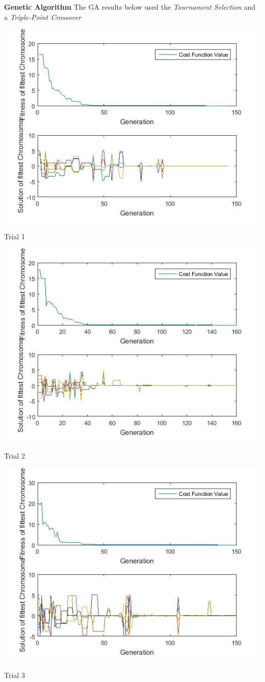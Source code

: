 \documentclass{article}
\begin{document}
\textbf{Genetic Algorithm} The GA results below used the \textit{Tournament Selection} and a \textit{Triple-Point Crossover}\\
\centerline{\includegraphics[width=0.5\linewidth]{ga_tf4_s1_c2a}}
\centerline{Trial 1}
\centerline{\includegraphics[width=0.5\linewidth]{ga_tf4_s1_c2b}}
\centerline{Trial 2}
\centerline{\includegraphics[width=0.5\linewidth]{ga_tf4_s1_c2c}}
\centerline{Trial 3}
\end{document}
